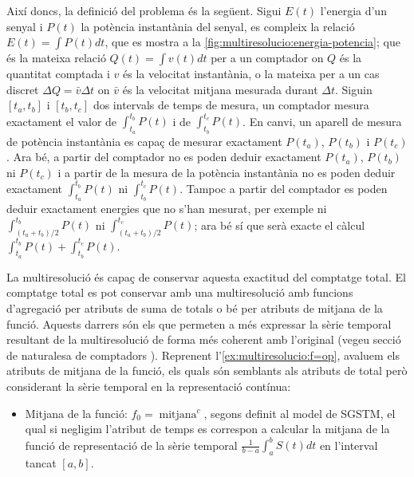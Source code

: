 \begin{example}
Així doncs, la definició del problema és la següent.  Sigui $E(t)$
l'energia d'un senyal i $P(t)$ la potència instantània del senyal, es
compleix la relació $E(t)=\int P(t) dt$, que es mostra a la
\autoref{fig:multiresolucio:energia-potencia}; que és la mateixa
relació $Q(t)=\int v(t) dt$ per a un comptador on $Q$ és la quantitat
comptada i $v$ és la velocitat instantània, o la mateixa per a un cas
discret $\Delta Q = \bar{v} \Delta t$ on $\bar{v}$ és la velocitat
mitjana mesurada durant $\Delta t$. %
  Siguin
  $[t_a,t_b]$ i $[t_b,t_c]$ dos intervals de temps de mesura, un
  comptador mesura exactament el valor de $\int_{t_a}^{t_b} P(t)$ i de
  $\int_{t_b}^{t_c} P(t)$. En canvi, un aparell de mesura de potència
  instantània es capaç de mesurar exactament $P(t_a)$, $P(t_b)$ i
  $P(t_c)$. Ara bé, a partir del comptador no es poden deduir
  exactament $P(t_a)$, $P(t_b)$ ni $P(t_c)$ i a partir de la mesura de
  la potència instantània no es poden deduir exactament
  $\int_{t_a}^{t_b} P(t)$ ni $\int_{t_b}^{t_c} P(t)$. Tampoc a partir
  del comptador es poden deduir exactament energies que no s'han
  mesurat, per exemple ni $\int_{(t_a+t_b)/2}^{t_b} P(t)$ ni
  $\int_{(t_a+t_b)/2}^{t_c} P(t)$; ara bé sí que serà exacte el càlcul
  $\int_{t_a}^{t_b} P(t)+\int_{t_b}^{t_c} P(t)$.
  

  La multiresolució és capaç de conservar aquesta exactitud del
  comptatge total.  El comptatge total es pot conservar amb una
  multiresolució amb funcions d'agregació per atributs de suma de
  totals o bé per atributs de mitjana de la funció. Aquests darrers
  són els que permeten a més expressar la sèrie temporal resultant de
  la multiresolució de forma més coherent amb l'original (vegeu secció
  de naturalesa de comptadors ). Reprenent
  l'\autoref{ex:multiresolucio:f=op}, avaluem els atributs de mitjana
  de la funció, els quals són semblants als atributs de total però
  considerant la sèrie temporal en la representació contínua:
  
  \begin{itemize}

  \item Mitjana de la funció:
    $f_0=\operatorname{mitjana}^c$, segons definit al model de \gls{SGSTM}, el qual si
    negligim l'atribut de temps es correspon a calcular la mitjana
    de la funció de representació de la sèrie temporal $\frac{1}{b-a}
    \int_{a}^{b} S(t)dt$ en l'interval tancat $[a,b]$.


\end{itemize}
\end{example}
